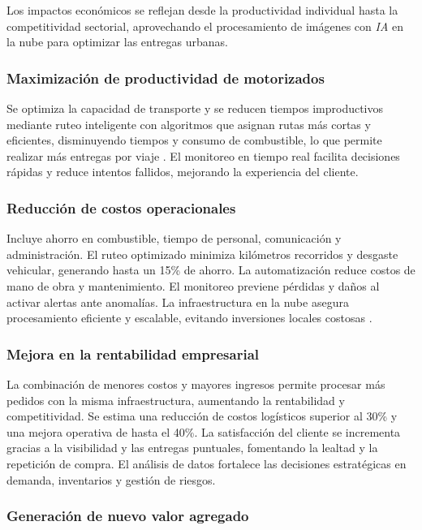 Los impactos económicos se reflejan desde la productividad individual hasta la competitividad sectorial, aprovechando el procesamiento de imágenes con \textit{IA} en la nube para optimizar las entregas urbanas.

\subsubsection{Maximización de productividad de motorizados}

Se optimiza la capacidad de transporte y se reducen tiempos improductivos mediante ruteo inteligente con algoritmos que asignan rutas más cortas y eficientes, disminuyendo tiempos y consumo de combustible, lo que permite realizar más entregas por viaje \cite{WebRef132362}. El monitoreo en tiempo real facilita decisiones rápidas y reduce intentos fallidos, mejorando la experiencia del cliente.

\subsubsection{Reducción de costos operacionales}

Incluye ahorro en combustible, tiempo de personal, comunicación y administración. El ruteo optimizado minimiza kilómetros recorridos y desgaste vehicular, generando hasta un 15\% de ahorro. La automatización reduce costos de mano de obra y mantenimiento. El monitoreo previene pérdidas y daños al activar alertas ante anomalías. La infraestructura en la nube asegura procesamiento eficiente y escalable, evitando inversiones locales costosas \cite{RedaccinTLW2024}.

\subsubsection{Mejora en la rentabilidad empresarial}

La combinación de menores costos y mayores ingresos permite procesar más pedidos con la misma infraestructura, aumentando la rentabilidad y competitividad. Se estima una reducción de costos logísticos superior al 30\% y una mejora operativa de hasta el 40\%. La satisfacción del cliente se incrementa gracias a la visibilidad y las entregas puntuales, fomentando la lealtad y la repetición de compra. El análisis de datos fortalece las decisiones estratégicas en demanda, inventarios y gestión de riesgos.

\subsubsection{Generación de nuevo valor agregado}


